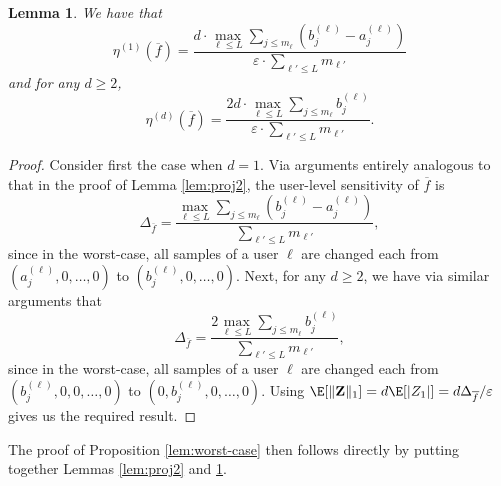 \documentclass[conference,letterpaper]{IEEEtran}
\newtheorem{lemma}{Lemma}[section]
\theoremstyle{remark}
\newtheorem*{remark}{Remark}
\theoremstyle{definition}
\begin{document}
\begin{lemma}
	\label{lem:proj3}
	We have that $$\eta^{(1)}(\overline{f}) = \frac{d\cdot \max_{\ell\leq L} \sum_{j\leq m_\ell} \left(b_j^{(\ell)}-a_j^{(\ell)}\right)}{\varepsilon\cdot \sum_{\ell'\leq L} m_{\ell'}}$$
	and for any $d\geq 2$,
	$$\eta^{(d)}(\overline{f}) = \frac{2d\cdot \max_{\ell\leq L} \sum_{j\leq m_\ell} b_j^{(\ell)}}{\varepsilon\cdot \sum_{\ell'\leq L} m_{\ell'}}.$$
\end{lemma}
\begin{proof}
Consider first the case when $d = 1$. Via arguments entirely analogous to that in the proof of Lemma \ref{lem:proj2}, the user-level sensitivity of $\overline{f}$ is
$$
	\Delta_{\overline{f}} = \frac{\max_{\ell\leq L} \sum_{j\leq m_\ell} \left(b_j^{(\ell)}-a_j^{(\ell)}\right)}{\sum_{\ell'\leq L} m_{\ell'}},
$$
since in the worst-case, all samples of a user $\ell$ are changed each from $(a_j^{(\ell)},0,\ldots,0)$ to $(b_j^{(\ell)},0,\ldots,0)$. Next, for any $d\geq 2$, we have via similar arguments that
$$
\Delta_{\overline{f}} = \frac{2\max_{\ell\leq L} \sum_{j\leq m_\ell} b_j^{(\ell)}}{\sum_{\ell'\leq L} m_{\ell'}},
$$
since in the worst-case, all samples of a user $\ell$ are changed each from $(b_j^{(\ell)},0,0,\ldots,0)$ to $(0,b_j^{(\ell)},0,\ldots,0)$.
Using $\E[\lVert \mathbf{Z}\rVert_1] = d\E[|Z_1|] = d\Delta_{\overline{f}} /\varepsilon$ gives us the required result.
\end{proof}
The proof of Proposition \ref{lem:worst-case} then follows directly by putting together Lemmas \ref{lem:proj2} and \ref{lem:proj3}.
\end{document}
